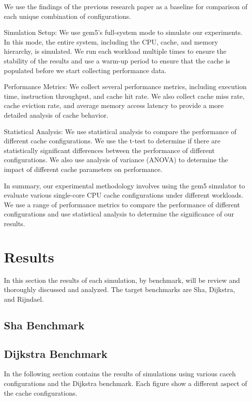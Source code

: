 \documentclass[conference]{IEEEtran}
\begin{document}
We use the findings of the previous research paper as a baseline for comparison of each unique combination of configurations.

Simulation Setup:
We use gem5's full-system mode to simulate our experiments. In this mode, the entire system, including the CPU, cache, and memory hierarchy, is simulated. We run each workload multiple times to ensure the stability of the results and use a warm-up period to ensure that the cache is populated before we start collecting performance data.

Performance Metrics:
We collect several performance metrics, including execution time, instruction throughput, and cache hit rate. We also collect cache miss rate, cache eviction rate, and average memory access latency to provide a more detailed analysis of cache behavior.

Statistical Analysis:
We use statistical analysis to compare the performance of different cache configurations. We use the t-test to determine if there are statistically significant differences between the performance of different configurations. We also use analysis of variance (ANOVA) to determine the impact of different cache parameters on performance.

In summary, our experimental methodology involves using the gem5 simulator to evaluate various single-core CPU cache configurations under different workloads. We use a range of performance metrics to compare the performance of different configurations and use statistical analysis to determine the significance of our results.

\section{Results}
In this section the results of each simulation, by benchmark, will be review and thoroughly discussed and analyzed. The target benchmarks are Sha, Dijkstra, and Rijndael.

\subsection{Sha Benchmark}



\subsection{Dijkstra Benchmark}

In the following section contains the results of simulations using various caceh configurations and the Dijkstra benchmark. Each figure show a different aspect of the cache configurations.
\end{document}
